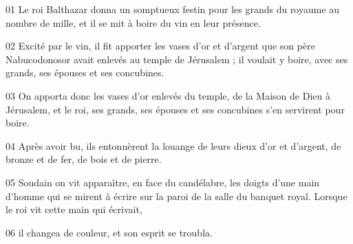 01 Le roi Balthazar donna un somptueux festin pour les grands du royaume au nombre de mille, et il se mit à boire du vin en leur présence.

02 Excité par le vin, il fit apporter les vases d’or et d’argent que son père Nabucodonosor avait enlevés au temple de Jérusalem ; il voulait y boire, avec ses grands, ses épouses et ses concubines.

03 On apporta donc les vases d’or enlevés du temple, de la Maison de Dieu à Jérusalem, et le roi, ses grands, ses épouses et ses concubines s’en servirent pour boire.

04 Après avoir bu, ils entonnèrent la louange de leurs dieux d’or et d’argent, de bronze et de fer, de bois et de pierre.

05 Soudain on vit apparaître, en face du candélabre, les doigts d’une main d’homme qui se mirent à écrire sur la paroi de la salle du banquet royal. Lorsque le roi vit cette main qui écrivait,

06 il changea de couleur, et son esprit se troubla.